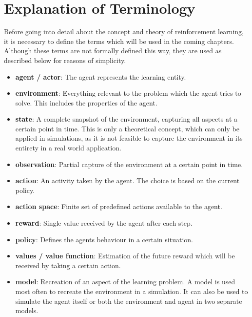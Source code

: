 \section{Explanation of Terminology}
Before going into detail about the concept and theory of reinforcement learning, it is necessary to define the terms which will be used in the coming chapters. Although these terms are not formally defined this way, they are used as described below for reasons of simplicity.
\begin{itemize}
    \item \textbf{agent / actor}: The agent represents the learning entity.
    \item \textbf{environment}: Everything relevant to the problem which the agent tries to solve. This includes the properties of the agent.
    \item \textbf{state}: A complete snapshot of the environment, capturing all aspects at a certain point in time. This is only a theoretical concept, which can only be applied in simulations, as it is not feasible to capture the environment in its entirety in a real world application.
    \item \textbf{observation}: Partial capture of the environment at a certain point in time.
    \item \textbf{action}: An activity taken by the agent. The choice is based on the current policy.
    \item \textbf{action space}: Finite set of predefined actions available to the agent.
    \item \textbf{reward}: Single value received by the agent after each step.
    \item \textbf{policy}: Defines the agents behaviour in a certain situation.
    \item \textbf{values / value function}: Estimation of the future reward which will be received by taking a certain action.
    \item \textbf{model}: Recreation of an aspect of the learning problem. A model is used most often to recreate the environment in a simulation. It can also be used to simulate the agent itself or both the environment and agent in two separate models.
\end{itemize}

